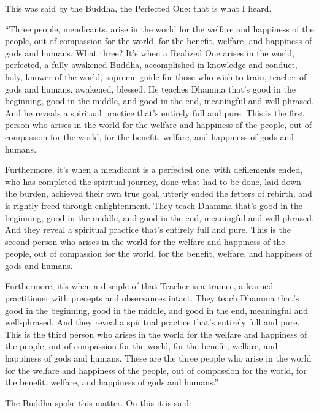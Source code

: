 \documentclass[12pt,openany]{book}%
\begin{document}
This was said by the Buddha, the Perfected One: that is what I heard. 

“Three people, mendicants, arise in the world for the welfare and happiness of the people, out of compassion for the world, for the benefit, welfare, and happiness of gods and humans. What three? It’s when a Realized One arises in the world, perfected, a fully awakened Buddha, accomplished in knowledge and conduct, holy, knower of the world, supreme guide for those who wish to train, teacher of gods and humans, awakened, blessed. He teaches Dhamma that’s good in the beginning, good in the middle, and good in the end, meaningful and well-phrased. And he reveals a spiritual practice that’s entirely full and pure. This is the first person who arises in the world for the welfare and happiness of the people, out of compassion for the world, for the benefit, welfare, and happiness of gods and humans. 

Furthermore, it’s when a mendicant is a perfected one, with defilements ended, who has completed the spiritual journey, done what had to be done, laid down the burden, achieved their own true goal, utterly ended the fetters of rebirth, and is rightly freed through enlightenment. They teach Dhamma that’s good in the beginning, good in the middle, and good in the end, meaningful and well-phrased. And they reveal a spiritual practice that’s entirely full and pure. This is the second person who arises in the world for the welfare and happiness of the people, out of compassion for the world, for the benefit, welfare, and happiness of gods and humans. 

Furthermore, it’s when a disciple of that Teacher is a trainee, a learned practitioner with precepts and observances intact. They teach Dhamma that’s good in the beginning, good in the middle, and good in the end, meaningful and well-phrased. And they reveal a spiritual practice that’s entirely full and pure. This is the third person who arises in the world for the welfare and happiness of the people, out of compassion for the world, for the benefit, welfare, and happiness of gods and humans. These are the three people who arise in the world for the welfare and happiness of the people, out of compassion for the world, for the benefit, welfare, and happiness of gods and humans.” 

The Buddha spoke this matter. On this it is said: 
\end{document}
